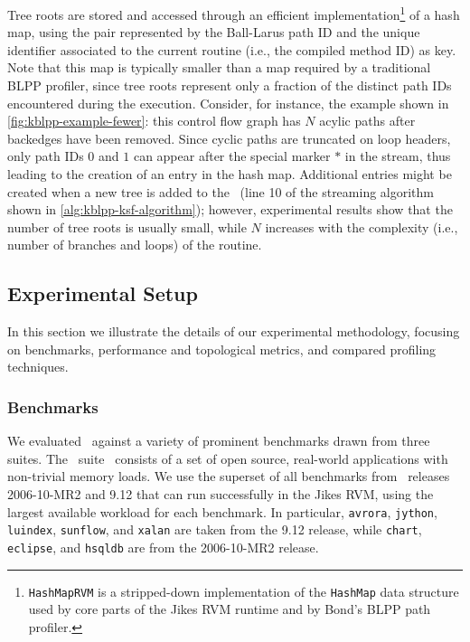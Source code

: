 \noindent Tree roots are stored and accessed through an efficient implementation\footnote{{\tt HashMapRVM} is a stripped-down implementation of the {\tt HashMap} data structure used by core parts of the Jikes RVM runtime and by Bond's BLPP path profiler.} of a hash map, using the pair represented by the Ball-Larus path ID and the unique identifier associated to the current routine (i.e., the compiled method ID) as key. Note that this map is typically smaller than a map required by a traditional BLPP profiler, since tree roots represent only a fraction of the distinct path IDs encountered during the execution. Consider, for instance, the example shown in \myfigure\ref{fig:kblpp-example-fewer}: this control flow graph has $N$ acylic paths after backedges have been removed. Since cyclic paths are truncated on loop headers, only path IDs $0$ and $1$ can appear after the special marker $*$ in the stream, thus leading to the creation of an entry in the hash map. Additional entries might be created when a new tree is added to the \ksf\ (line 10 of the streaming algorithm shown in \myalgorithm\ref{alg:kblpp-ksf-algorithm}); however, experimental results show that the number of tree roots is usually small, while $N$ increases with the complexity (i.e., number of branches and loops) of the routine.

\subsection{Experimental Setup}

In this section we illustrate the details of our experimental methodology, focusing on benchmarks, performance and topological metrics, and compared profiling techniques.

\subsubsection*{Benchmarks}

We evaluated \kblpp\ against a variety of prominent benchmarks drawn from three suites. The \dacapo\ suite~\cite{Blackburn06} consists of a set of open source, real-world applications with non-trivial memory loads. We use the superset of all benchmarks from \dacapo\ releases 2006-10-MR2 and 9.12 that can run successfully in the Jikes RVM, using the largest available workload for each benchmark. In particular, {\tt avrora}, {\tt jython}, {\tt luindex}, {\tt sunflow}, and {\tt xalan} are taken from the 9.12 release, while {\tt chart}, {\tt eclipse}, and {\tt hsqldb} are from the 2006-10-MR2 release.

